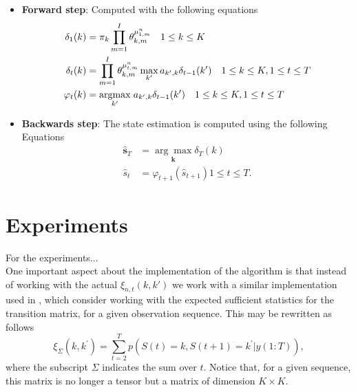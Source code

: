 \documentclass[12pt]{article}
\begin{document}
\begin{itemize}
	\item \textbf{Forward step}: Computed with the following equations
	\begin{align}
	\delta_{1}(k)&=\pi_{k} \prod\limits_{m=1}^{I}\theta_{k,m}^{\mu^{n}_{1,m}} \quad 1 \leq k \leq K\\
	\delta_{t}(k)&=\prod\limits_{m=1}^{I}\theta_{k,m}^{\mu^{n}_{t,m}} \max _{k'} a_{k',k} \delta_{t-1}(k') \quad 1 \leq k \leq K , 1 \leq t \leq T \\
	\varphi_{t}(k)&=\underset{k'}{\operatorname{argmax}} \hspace{0.1cm}a_{k',k} \delta_{t-1}(k') \quad 1 \leq k \leq K , 1 \leq t \leq T \\
	\end{align}
	\item \textbf{Backwards step}: The state estimation is computed using the following Equations
	\begin{align}
	\hat{\mathbf{s}}_{T}&=\underset{\boldsymbol{k}}{\arg \max } \delta_{T}(k)\\
	\hat{s}_{t}&=\varphi_{t+1}\left(\hat{s}_{t+1}\right)  1 \leq t \leq T.
	\end{align} 
\end{itemize}

\section{Experiments}
For the experiments...\\

\noindent One important aspect about the implementation of the algorithm is that instead of working with the actual $\xi _ { n,t } ( k , k' )$ we work with a similar implementation used in \cite{murphy2012machine}, which consider working with the expected sufficient statistics for the transition matrix, for a given observation sequence. This may be rewritten as follows
\begin{equation}
\xi_\Sigma(k,k^{\prime}) = \sum\limits_{t=2}^{T} p(S(t) = k, S(t+1) = k^{\prime} | y(1:T)),
\end{equation}
where the subscript $\Sigma$ indicates the sum over $t$. Notice that, for a given sequence, this matrix is no longer a tensor but a matrix of dimension $K\times K$.
\end{document}
